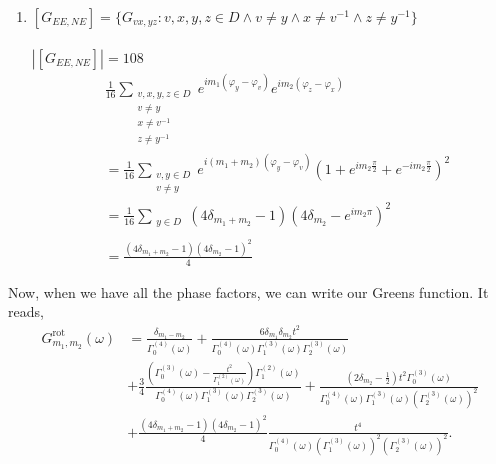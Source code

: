 \documentclass{article}
\newcommand{\abs}[1]{\left\vert #1 \right\vert}
\begin{document}
\begin{enumerate}
    \item  $[G_{EE,NE}] = \{G_{vx,yz} : v, x, y, z \in D \land v \neq y \land x \neq v^{-1} \land z \neq y^{-1}\}$
    \\\\$\abs{[G_{EE,NE}]} = 108$
    \begin{equation}
    \begin{split}
    &\frac{1}{16}
    \sum_{\substack{
        v, x, y, z \in D \\
        v \neq y \\
        x \neq v^{-1} \\
        z \neq y^{-1}
    }}
        e^{i m_1 (\varphi_{y} - \varphi_{v})}
        e^{i m_2 (\varphi_{z} - \varphi_{x})}
   \\ &=
    \frac{1}{16}
    \sum_{\substack{
        v, y \in D \\
        v \neq y
    }}
        e^{i (m_1 + m_2) (\varphi_{y} - \varphi_{v})}
        \left( 1 + e^{i m_2 \frac{\pi}{2}} +
        e^{-i m_2 \frac{\pi}{2}} \right)^2
   \\ &=
    \frac{1}{16}
    \sum_{\substack{
        y \in D \\
    }}
        (4\delta_{m_1 + m_2} - 1)
        (4\delta_{m_2} - e^{i m_2 \pi})^2
   \\ &=
    \frac{
        (4\delta_{m_1 + m_2} - 1)
        (4\delta_{m_2} - 1)^2    
    }{4}
    \end{split}
    \end{equation}
\end{enumerate}
Now, when we have all the phase factors, we can write our Greens function. It reads,
\begin{equation}
\begin{split}
    G^{\text{rot}}_{m_1,m_2}(\omega) &= 
    \frac{\delta_{m_1 - m_2}}{\Gamma_0^{(4)}(\omega)} +
    \frac{6 \delta_{m_1} \delta_{m_2} t^2}
        {
            \Gamma_0^{(4)}(\omega)
            \Gamma_1^{(3)}(\omega)
            \Gamma_2^{(3)}(\omega)
        } \\
    &+ \frac{3}{4} \frac{
        \left(
        \Gamma_0^{(3)}(\omega)-\frac{t^2}{\Gamma_1^{(2)}(\omega)}
        \right)
        \Gamma_1^{(2)}(\omega)
        }
        {
            \Gamma_0^{(4)}(\omega)
            \Gamma_1^{(3)}(\omega)
            \Gamma_2^{(3)}(\omega)
        } +
    \frac{
        \left(2\delta_{m_2} - \frac{1}{2}\right)
        t^2\Gamma_0^{(3)}(\omega)
        }
        {
            \Gamma_0^{(4)}(\omega)
            \Gamma_1^{(3)}(\omega)
            \left(\Gamma_2^{(3)}(\omega)\right)^2
        } \\
    &+  \frac{
            (4\delta_{m_1 + m_2} - 1)
            (4\delta_{m_2} - 1)^2    
        }{4}
        \frac{
        t^4
        }
        {
            \Gamma_0^{(4)}(\omega)
            \left(\Gamma_1^{(3)}(\omega)\right)^2
            \left(\Gamma_2^{(3)}(\omega)\right)^2
        }.
\end{split}
\end{equation}
\end{document}
